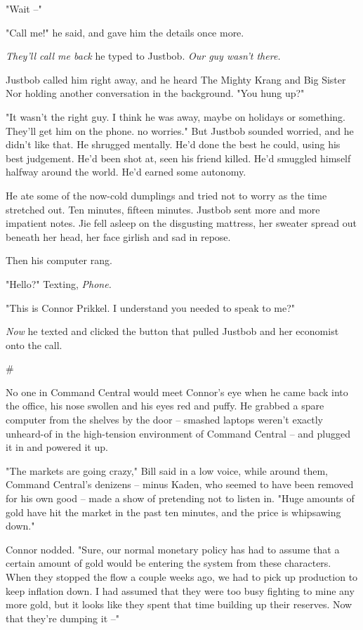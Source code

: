 "Wait --"

"Call me!" he said, and gave him the details once more.

\emph{They'll call me back} he typed to Justbob.
\emph{Our guy wasn't there.}

Justbob called him right away, and he heard The Mighty Krang and
Big Sister Nor holding another conversation in the background. "You
hung up?"

"It wasn't the right guy. I think he was away, maybe on holidays or
something. They'll get him on the phone. no worries." But Justbob
sounded worried, and he didn't like that. He shrugged mentally.
He'd done the best he could, using his best judgement. He'd been
shot at, seen his friend killed. He'd smuggled himself halfway
around the world. He'd earned some autonomy.

He ate some of the now-cold dumplings and tried not to worry as the
time stretched out. Ten minutes, fifteen minutes. Justbob sent more
and more impatient notes. Jie fell asleep on the disgusting
mattress, her sweater spread out beneath her head, her face girlish
and sad in repose.

Then his computer rang.

"Hello?" Texting, \emph{Phone.}

"This is Connor Prikkel. I understand you needed to speak to me?"

\emph{Now} he texted and clicked the button that pulled Justbob and
her economist onto the call.

\#

No one in Command Central would meet Connor's eye when he came back
into the office, his nose swollen and his eyes red and puffy. He
grabbed a spare computer from the shelves by the door -- smashed
laptops weren't exactly unheard-of in the high-tension environment
of Command Central -- and plugged it in and powered it up.

"The markets are going crazy," Bill said in a low voice, while
around them, Command Central's denizens -- minus Kaden, who seemed
to have been removed for his own good -- made a show of pretending
not to listen in. "Huge amounts of gold have hit the market in the
past ten minutes, and the price is whipsawing down."

Connor nodded. "Sure, our normal monetary policy has had to assume
that a certain amount of gold would be entering the system from
these characters. When they stopped the flow a couple weeks ago, we
had to pick up production to keep inflation down. I had assumed
that they were too busy fighting to mine any more gold, but it
looks like they spent that time building up their reserves. Now
that they're dumping it --"

